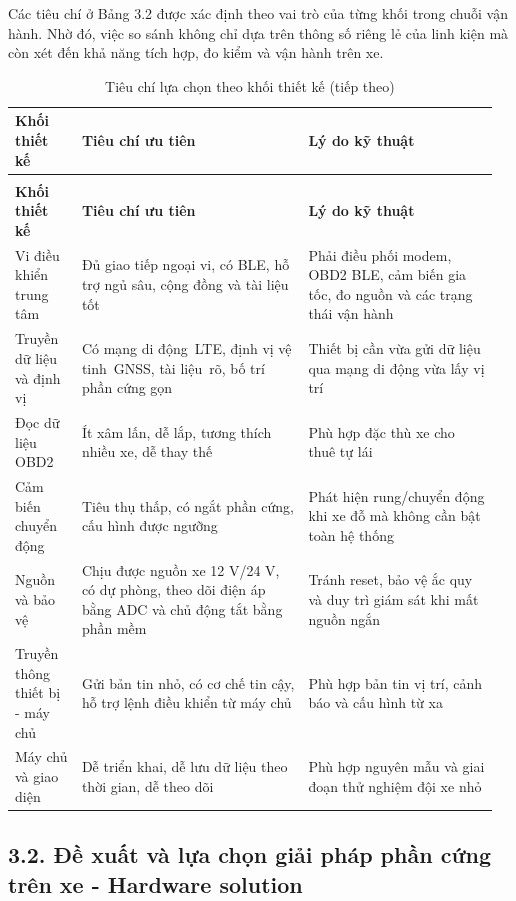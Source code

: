 \documentclass[a4paper]{extarticle}
\newcommand{\thesissettableid}[2]{%
  \renewcommand{\thetable}{#1}%
  \renewcommand{\theHtable}{#2}%
}
\begin{document}
Các tiêu chí ở Bảng 3.2 được xác định theo vai trò của từng khối trong chuỗi vận hành. Nhờ đó, việc so sánh không chỉ dựa trên thông số riêng lẻ của linh kiện mà còn xét đến khả năng tích hợp, đo kiểm và vận hành trên xe.

{\thesissettableid{3.2}{condensed-bang-3-2-tieu-chi-lua-chon-theo-khoi-thiet-ke}
\def\LTcaptype{table}
\begin{longtable}{|L{0.139\linewidth}|L{0.446\linewidth}|L{0.374\linewidth}|}
\caption{Tiêu chí lựa chọn theo khối thiết kế}\label{tab:condensed-bang-3-2-tieu-chi-lua-chon-theo-khoi-thiet-ke}\\
\hline
\textbf{Khối thiết kế} & \textbf{Tiêu chí ưu tiên} & \textbf{Lý do kỹ thuật} \\
\hline
\endfirsthead
\caption[]{Tiêu chí lựa chọn theo khối thiết kế (tiếp theo)}\\
\hline
\textbf{Khối thiết kế} & \textbf{Tiêu chí ưu tiên} & \textbf{Lý do kỹ thuật} \\
\hline
\endhead
\endfoot
\endlastfoot
Vi điều khiển trung tâm & Đủ giao tiếp ngoại vi, có BLE, hỗ trợ ngủ sâu, cộng đồng và tài liệu tốt & Phải điều phối modem, OBD2 BLE, cảm biến gia tốc, đo nguồn và các trạng thái vận hành \\\hline
Truyền dữ liệu và định vị & Có mạng di động~LTE, định vị vệ tinh~GNSS, tài liệu~rõ, bố trí phần cứng gọn & Thiết bị cần vừa gửi dữ liệu qua mạng di động vừa lấy vị trí \\\hline
Đọc dữ liệu OBD2 & Ít xâm lấn, dễ lắp, tương thích nhiều xe, dễ thay thế & Phù hợp đặc thù xe cho thuê tự lái \\\hline
Cảm biến chuyển động & Tiêu thụ thấp, có ngắt phần cứng, cấu hình được ngưỡng & Phát hiện rung/chuyển động khi xe đỗ mà không cần bật toàn hệ thống \\\hline
Nguồn và bảo vệ & Chịu được nguồn xe 12 V/24 V, có dự phòng, theo dõi điện áp bằng ADC và chủ động tắt bằng phần mềm & Tránh reset, bảo vệ ắc quy và duy trì giám sát khi mất nguồn ngắn \\\hline
Truyền thông thiết bị - máy chủ & Gửi bản tin nhỏ, có cơ chế tin cậy, hỗ trợ lệnh điều khiển từ máy chủ & Phù hợp bản tin vị trí, cảnh báo và cấu hình từ xa \\\hline
Máy chủ và giao diện & Dễ triển khai, dễ lưu dữ liệu theo thời gian, dễ theo dõi & Phù hợp nguyên mẫu và giai đoạn thử nghiệm đội xe nhỏ \\\hline
\end{longtable}
}

\subsection{3.2. Đề xuất và lựa chọn giải pháp phần cứng trên xe - Hardware solution}\label{ux111ux1ec1-xuux1ea5t-vuxe0-lux1ef1a-chux1ecdn-giux1ea3i-phuxe1p-phux1ea7n-cux1ee9ng-truxean-xe---hardware-solution}
\end{document}
